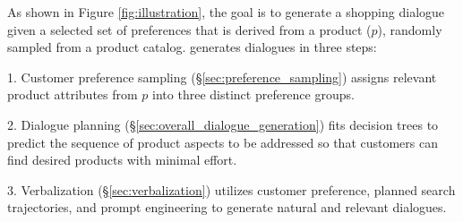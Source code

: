 
As shown in Figure \ref{fig:illustration}, the goal is to generate a shopping dialogue given a selected set of preferences that is derived from a product ($p$), randomly sampled from a product catalog. \method generates dialogues in three steps:

1. Customer preference sampling (\S\ref{sec:preference_sampling}) assigns relevant product attributes from $p$ into three distinct preference groups. 

2. Dialogue planning (\S\ref{sec:overall_dialogue_generation}) fits decision trees to predict the sequence of product aspects to be addressed so that customers can find desired products with minimal effort. 

3. Verbalization (\S\ref{sec:verbalization}) utilizes customer preference, planned search trajectories, and prompt engineering to generate natural and relevant dialogues.

